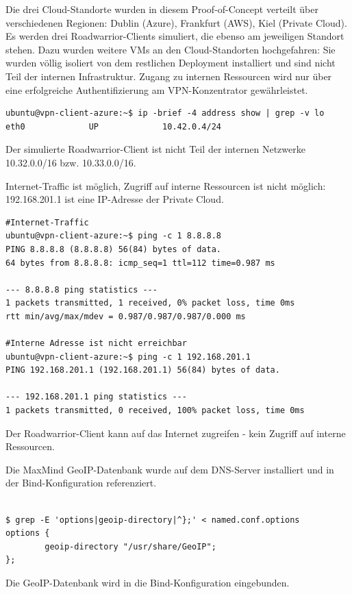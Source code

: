 Die drei Cloud-Standorte wurden in diesem Proof-of-Concept verteilt über verschiedenen Regionen: Dublin (Azure), Frankfurt (AWS), Kiel (Private Cloud). Es werden drei Roadwarrior-Clients simuliert, die ebenso am jeweiligen Standort stehen. Dazu wurden weitere VMs an den Cloud-Standorten hochgefahren: Sie wurden völlig isoliert von dem restlichen \gls{Deployment} installiert und sind nicht Teil der internen Infrastruktur. Zugang zu internen Ressourcen wird nur über eine erfolgreiche Authentifizierung am VPN-Konzentrator gewährleistet.
\begin{listing}[h]
\begin{verbatim}
ubuntu@vpn-client-azure:~$ ip -brief -4 address show | grep -v lo
eth0             UP             10.42.0.4/24

\end{verbatim}
\caption{Der simulierte Roadwarrior-Client ist nicht Teil der internen Netzwerke 10.32.0.0/16 bzw. 10.33.0.0/16.}
\label{ext-ip-addr-roadwarrior}
\end{listing}\FloatBarrier
Internet-Traffic ist möglich, Zugriff auf interne Ressourcen ist nicht möglich: 192.168.201.1 ist eine IP-Adresse der Private Cloud.
\begin{listing}[h]
\begin{verbatim}
#Internet-Traffic
ubuntu@vpn-client-azure:~$ ping -c 1 8.8.8.8
PING 8.8.8.8 (8.8.8.8) 56(84) bytes of data.
64 bytes from 8.8.8.8: icmp_seq=1 ttl=112 time=0.987 ms

--- 8.8.8.8 ping statistics ---
1 packets transmitted, 1 received, 0% packet loss, time 0ms
rtt min/avg/max/mdev = 0.987/0.987/0.987/0.000 ms

#Interne Adresse ist nicht erreichbar 
ubuntu@vpn-client-azure:~$ ping -c 1 192.168.201.1
PING 192.168.201.1 (192.168.201.1) 56(84) bytes of data.

--- 192.168.201.1 ping statistics ---
1 packets transmitted, 0 received, 100% packet loss, time 0ms

\end{verbatim}
\caption{Der Roadwarrior-Client kann auf das Internet zugreifen - kein Zugriff auf interne Ressourcen.}
\label{internet-access-roadwarrior}
\end{listing}\FloatBarrier
Die MaxMind GeoIP-Datenbank wurde auf dem DNS-Server installiert und in der Bind-Konfiguration referenziert.
\begin{listing}[h]
\begin{verbatim}

$ grep -E 'options|geoip-directory|^};' < named.conf.options
options {
        geoip-directory "/usr/share/GeoIP";
};

\end{verbatim}
\caption{Die GeoIP-Datenbank wird in die Bind-Konfiguration eingebunden.}
\label{bind-geoip-directory}
\end{listing}\FloatBarrier
